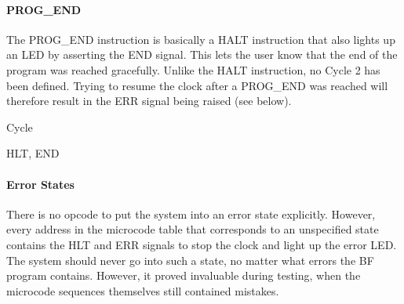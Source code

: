 \paragraph{PROG\_END}
The PROG\_END instruction is basically a HALT instruction that also lights up an LED by asserting the END signal. This lets the user know that the end of the program was reached gracefully. Unlike the HALT instruction, no Cycle 2 has been defined. Trying to resume the clock after a PROG\_END was reached will therefore result in the ERR signal being raised (see below).

\begin{labeledenum}{Cycle}
\item HLT, END
\end{labeledenum}

\paragraph{Error States}
There is no opcode to put the system into an error state explicitly. However, every address in the microcode table that corresponds to an unspecified state contains the HLT and ERR signals to stop the clock and light up the error LED. The system should never go into such a state, no matter what errors the BF program contains. However, it proved invaluable during testing, when the microcode sequences themselves still contained mistakes.


